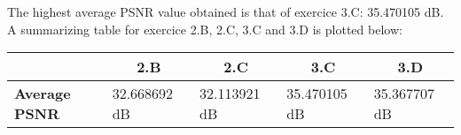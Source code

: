 \section[Given the complex error pattern, what is the highest PSNR value obtained for the
entire Beowulf video sequence (calculated as the average of all frame PSNR values),
for Exercise 2.B, Exercise 2.C, Exercise 3.C, and Exercise 3.D? Plot the different
PSNR values in a summarizing table.]{}
The highest average PSNR value obtained is that of exercice 3.C: 35.470105 dB. A summarizing table for exercice 2.B, 2.C, 3.C and 3.D is plotted below:

\begin{table}[h]
\centering
\begin{tabular}{l|l|l|l|l|}
\cline{2-5}
                                            & \multicolumn{1}{c|}{\textbf{2.B}} & \multicolumn{1}{c|}{\textbf{2.C}} & \multicolumn{1}{c|}{\textbf{3.C}} & \multicolumn{1}{c|}{\textbf{3.D}} \\ \hline
\multicolumn{1}{|l|}{\textbf{Average PSNR}} & 32.668692 dB                         & 32.113921 dB                         & 35.470105 dB                        & 35.367707 dB                        \\ \hline
\end{tabular}
\end{table}